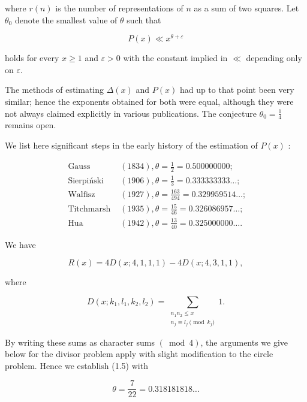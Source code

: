 \documentclass[10pt]{article}
\begin{document}
where $r(n)$ is the number of representations of $n$ as a sum of two squares. Let $\theta_{0}$ denote the smallest value of $\theta$ such that


\begin{equation*}
P(x) \ll x^{\theta+\varepsilon} \tag{1.5}
\end{equation*}


holds for every $x \geqslant 1$ and $\varepsilon>0$ with the constant implied in $\ll$ depending only on $\varepsilon$.

The methods of estimating $\Delta(x)$ and $P(x)$ had up to that point been very similar; hence the exponents obtained for both were equal, although they were not always claimed explicitly in various publications. The conjecture $\theta_{0}=\frac{1}{4}$ remains open.

We list here significant steps in the early history of the estimation of $P(x)$ :

$$
\begin{array}{ll}
\text { Gauss } & (1834), \theta=\frac{1}{2}=0.500000000 ; \\
\text { Sierpiński } & (1906), \theta=\frac{1}{3}=0.333333333 \ldots ; \\
\text { Walfisz } & (1927), \theta=\frac{163}{494}=0.329959514 \ldots ; \\
\text { Titchmarsh } & (1935), \theta=\frac{15}{46}=0.326086957 \ldots ; \\
\text { Hua } & (1942), \theta=\frac{13}{40}=0.325000000 \ldots .
\end{array}
$$

We have


\begin{equation*}
R(x)=4 D(x ; 4,1,1,1)-4 D(x ; 4,3,1,1), \tag{1.6}
\end{equation*}


where


\begin{equation*}
D\left(x ; k_{1}, l_{1}, k_{2}, l_{2}\right)=\sum_{\substack{n_{1} n_{2} \leqslant x \\ n_{j} \equiv l_{j}\pmod{k_j}}} 1 . \tag{1.7}
\end{equation*}


By writing these sums as character sums $(\bmod 4)$, the arguments we give below for the divisor problem apply with slight modification to the circle problem. Hence we establish (1.5) with


\begin{equation*}
\theta=\frac{7}{22}=0.318181818 \ldots \tag{1.8}
\end{equation*}
\end{document}

